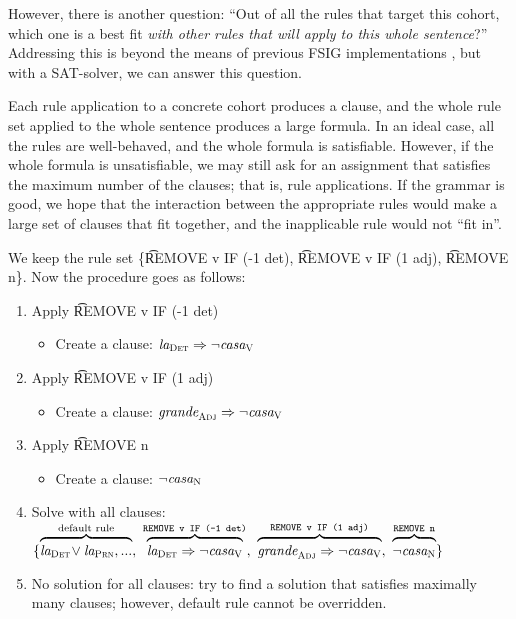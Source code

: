 However, there is another question: ``Out of all the rules that target this cohort, which one is a best fit \emph{with other rules that will apply to this whole sentence}?''
Addressing this is beyond the means of previous FSIG implementations , but with a SAT-solver, we can answer this question. 


Each rule application to a concrete cohort produces a clause,
and the whole rule set applied to the whole sentence produces 
a large formula. In an ideal case, all the rules are well-behaved, 
and the whole formula is satisfiable. However, if the whole formula 
is unsatisfiable, we may still ask for an assignment that satisfies 
the maximum number of the clauses; that is, rule applications. 
If the grammar is good, we hope that the interaction between 
the appropriate rules would make a large set of clauses that 
fit together, and the inapplicable rule would not ``fit in''.


We keep the rule set \{\t{REMOVE v IF (-1 det)}, \t{REMOVE v IF (1 adj)}, \t{REMOVE n}\}.
Now the procedure goes as follows:

\begin{enumerate}
\item Apply \t{REMOVE v IF (-1 det)}
 \begin{itemize}
    \item Create a clause: $\text{\em la}_{\text{\sc Det}} \Rightarrow \neg \text{\em casa}_{\text{\sc V}}$
 \end{itemize}
\item Apply \t{REMOVE v IF (1 adj)} 
 \begin{itemize}
    \item Create a clause: $\text{\em grande}_{\text{\sc Adj}} \Rightarrow \neg \text{\em casa}_{\text{\sc V}}$
 \end{itemize}
\item Apply \t{REMOVE n}
 \begin{itemize}
    \item Create a clause: $\neg \text{\em casa}_{\text{\sc N}}$
 \end{itemize}

\item Solve with all clauses:
  $\{ \ob{\laDet \! \vee \laPrn, ...}^{\text{default rule}}, \ 
      \ob{\laDet \Rightarrow \neg \casaV}^{\t{REMOVE v IF (-1 det)}}, \ 
      \ob{\grandeAdj \Rightarrow \neg \casaV}^{\t{REMOVE v IF (1 adj)}}, \ 
      \ob{\neg \casaN}^{\t{REMOVE n}} \}$
\item No solution for all clauses: try to find a solution that satisfies maximally many clauses; however, default rule cannot be overridden.
\end{enumerate}

